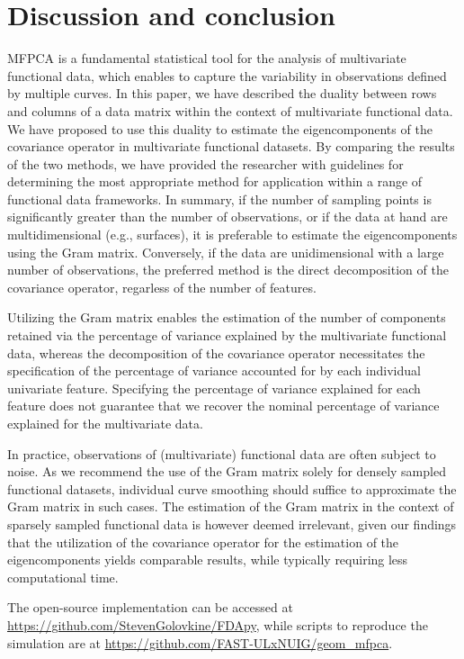 \section{Discussion and conclusion} %
\label{sec:discussion}

MFPCA is a fundamental statistical tool for the analysis of multivariate functional data, which enables to capture the variability in observations defined by multiple curves. In this paper, we have described the duality between rows and columns of a data matrix within the context of multivariate functional data. We have proposed to use this duality to estimate the eigencomponents of the covariance operator in multivariate functional datasets. By comparing the results of the two methods, we have provided the researcher with guidelines for determining the most appropriate method for application within a range of functional data frameworks. In summary, if the number of sampling points is significantly greater than the number of observations, or if the data at hand are multidimensional (e.g., surfaces), it is preferable to estimate the eigencomponents using the Gram matrix. Conversely, if the data are unidimensional with a large number of observations, the preferred method is the direct decomposition of the covariance operator, regarless of the number of features.

Utilizing the Gram matrix enables the estimation of the number of components retained via the percentage of variance explained by the multivariate functional data, whereas the decomposition of the covariance operator necessitates the specification of the percentage of variance accounted for by each individual univariate feature. Specifying the percentage of variance explained for each feature does not guarantee that we recover the nominal percentage of variance explained for the multivariate data. 

In practice, observations of (multivariate) functional data are often subject to noise. As we recommend the use of the Gram matrix solely for densely sampled functional datasets, individual curve smoothing should suffice to approximate the Gram matrix in such cases. The estimation of the Gram matrix in the context of sparsely sampled functional data is however deemed irrelevant, given our findings that the utilization of the covariance operator for the estimation of the eigencomponents yields comparable results, while typically requiring less computational time.

The open-source implementation can be accessed at \url{https://github.com/StevenGolovkine/FDApy}, while scripts to reproduce the simulation are at \url{https://github.com/FAST-ULxNUIG/geom_mfpca}.



